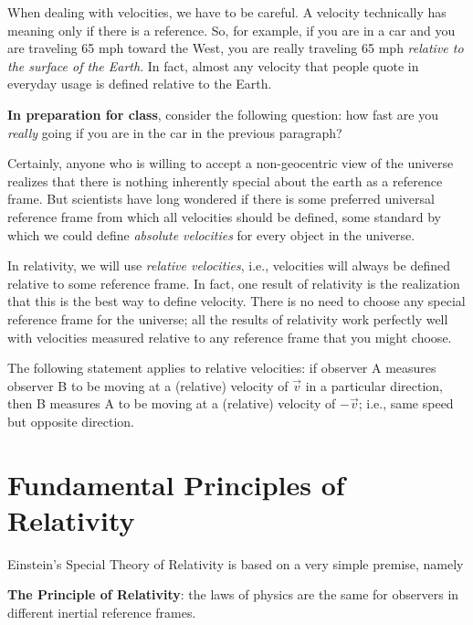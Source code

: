 When dealing with velocities, we have to be careful.  A velocity
technically has meaning only if there is a reference.  So, for
example, if you are in a car and you are traveling 65 mph toward the
West, you are really traveling 65 mph {\em relative to the
surface of the Earth}.  In fact, almost any velocity that people
quote in everyday usage is defined relative to the Earth.
   
\begin{boxittext}
{{\bf In preparation for class}, consider the following question: how
fast are you {\em really} going if you are in the car in the previous
paragraph?}
\end{boxittext}
   
Certainly, anyone who is willing to accept a non-geocentric view of
the universe realizes that there is nothing inherently special about
the earth as a reference frame.  But scientists have long wondered if
there is some preferred universal reference frame from which all
velocities should be defined, some standard by which we could define
{\em absolute velocities} for every object in the universe.
   
In relativity, we will use {\em relative velocities}, i.e.,
velocities will always be defined relative to some reference frame.
In fact, one result of relativity is the realization that this is the
best way to define velocity.  There is no need to choose any special
reference frame for the universe; all the results of relativity work
perfectly well with velocities measured relative to any reference
frame that you might choose.
   
The following statement applies to relative velocities: if observer A
measures observer B to be moving at a (relative) velocity of $\vec{v}$
in a particular direction, then B measures A to be moving at a
(relative) velocity of $-\vec{v}$; i.e., same speed but opposite
direction.

\section{Fundamental Principles of Relativity}

Einstein's Special Theory of Relativity is based on a very simple
premise, namely


\begin{boxittext} {{\bf The Principle of Relativity}: the laws of
    physics are the same for observers in different inertial reference
    frames.}
\end{boxittext}

